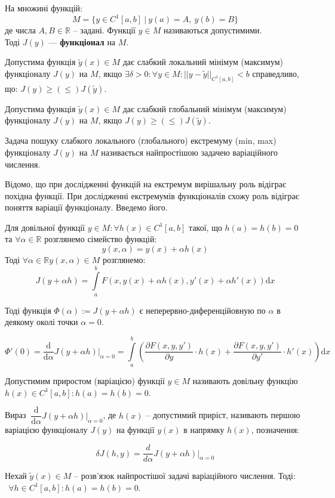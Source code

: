 \documentclass[14pt,a4paper]{scrartcl}
\theoremstyle{definition}
\theoremstyle{definition}
\theoremstyle{definition}
\begin{document}
На множині функцій:
$$M = \{ y \in C^1[a, b] \  | \  y(a) = A, \ y(b) = B\}$$
 де числа $A, B \in \mathbb{R}$ -- задані. Функції $y \in M$ називаються допустимими. \\
 Тоді $J(y)$ --- \textbf{функціонал} на $M$.

 Допустима функція $\tilde{y}(x) \in M$ дає слабкий локальний мінімум (максимум) функціоналу $J(y)$ на $M$, якщо $\exists \delta > 0 : \forall y \in M :|| y - \tilde{y}||_{C^1[a,b]} < b$ справедливо, що: $J(y) \geq (\leq) J(\tilde{y})$.

 Допустима функція $\tilde{y}(x) \in M$ дає слабкий глобальний мінімум (максимум) функціоналу $J(y)$ на $M$, якщо  $J(y) \geq (\leq) J(\tilde{y})$.

 Задача пошуку слабкого локального (глобального) екстремуму (min, max) функціоналу $J(y)$ на $M$ називається найпростішою задачею варіаційного числення.

Відомо, що при дослідженні функцій на екстремум вирішальну роль відіграє похідна функції. При дослідженні екстремумів функціоналів схожу роль відіграє поняття варіації функціоналу. Введемо його.

Для довільної функції $y \in M : \forall h(x) \in C^1[a, b]$ такої, що $h(a) = h(b) = 0$ та $\forall \alpha \in \mathbb{R}$ розглянемо сімейство функцій: $$y(x, \alpha) = y(x) + \alpha h(x)$$
Тоді $\forall \alpha \in \mathbb{R} y(x, \alpha) \in M$ розглянемо: $$ J(y + \alpha h) = \int\limits_{a}^{b} F(x, y(x) + \alpha h(x), y'(x) + \alpha h'(x)) \mathrm{d}x$$

Тоді функція $\Phi(\alpha) := J(y + \alpha h)$ є неперервно-диференційовную по $\alpha$ в деякому околі точки $\alpha = 0$.

$$\Phi'(0) = \dfrac{\mathrm{d}}{\mathrm{d}\alpha}J(y + \alpha h)\Big|_{\alpha = 0} = \int\limits_{a}^{b}\left(\dfrac{\partial F(x, y, y')}{\partial y} \cdot h(x) + \dfrac{\partial F(x, y, y')}{\partial y'} \cdot h'(x)\right)\mathrm{d}x$$

 Допустимим приростом (варіацією) функції $y \in M$ називають довільну функцію $h(x) \in C^1[a, b] : h(a) = h(b) = 0$.

Вираз $\ \dfrac{\mathrm{d}}{\mathrm{d}\alpha} J(y + \alpha h)\Big|_{\alpha = 0}$, де $h(x)$ -- допустимий приріст, називають першою варіацією функціоналу $J(y)$ на функції $y(x)$ в напрямку $h(x)$, позначення:

$$ \delta J(h, y) =  \dfrac{d}{d\alpha} J(y + \alpha h)\Big|_{\alpha = 0}$$

\begin{boxteo}
  Нехай $\tilde{y}(x) \in M$ --  розв'язок найпростішої задачі варіаційного числення. Тоді:
  \  $\ \  \forall h \in C^1[a, b] : h(a) = h(b) = 0$.
\end{boxteo}
\end{document}
